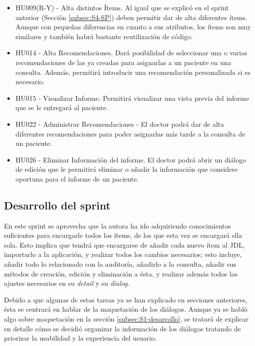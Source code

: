 \begin{itemize}
\item HU009(R-Y) - Alta distintos Ítems. Al igual que se explicó en el sprint anterior (Sección \ref{subsec:S4-SP}) deben permitir dar de alta diferentes ítems. Aunque con pequeñas diferencias en cuanto a sus atributos, los ítems son muy similares y también habrá bastante reutilización de código.
\item HU014 - Alta Recomendaciones. Dará posibilidad de seleccionar una o varias recomendaciones de las ya creadas para asignarlas a un paciente en una consulta. Además, permitirá introducir una recomendación personalizada si es necesario.
\item HU015 - Visualizar Informe. Permitirá visualizar una vista previa del informe que se le entregará al paciente.
\item HU022 - Administrar Recomendaciones - El doctor podrá dar de alta diferentes recomendaciones para poder asignarlas más tarde a la consulta de un paciente.
\item HU026 - Eliminar Información del informe. El doctor podrá abrir un diálogo de edición que le permitirá eliminar o añadir la información que considere oportuna para el informe de un paciente.

\end{itemize}


\subsection{Desarrollo del sprint}
\label{subsec:S5-desarrollo}

En este sprint se aprovecha que la autora ha ido adquiriendo conocimientos suficientes para encargarle todos los ítems, de los que esta vez se encargará ella sola. Esto implica que tendrá que encargarse de añadir cada nuevo ítem al JDL, importarlo a la aplicación, y realizar todos los cambios necesarios; esto incluye, añadir todo lo relacionado con la auditoría, añadirlo a la consulta, añadir sus métodos de creación, edición y eliminación a ésta, y realizar además todos los ajustes necesarios en su \emph{detail} y su \emph{dialog}.

Debido a que algunas de estas tareas ya se han explicado en secciones anteriores, ésta se centrará en hablar de la maquetación de los diálogos. Aunque ya se habló algo sobre maquetación en la sección \ref{subsec:S1-desarrollo}, se tratará de explicar en detalle cómo se decidió organizar la información de los diálogos tratando de priorizar la usabilidad y la experiencia del usuario.

